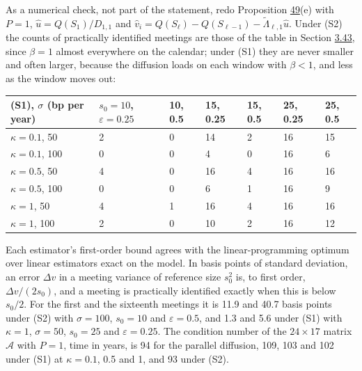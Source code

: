 \documentclass[11pt]{article}
\begin{document}
As a numerical check, not part of the statement, redo Proposition \hyperref[res:Proposition-49]{49}(e) with \(P=1\), \(\hat u=Q(S_1)/D_{1,1}\) and \(\hat v_i=Q(S_\ell)-Q(S_{\ell-1})-\tilde\Lambda_{\ell,1}\hat u\). Under (S2) the counts of practically identified meetings are those of the table in Section \hyperref[sec:3.43]{3.43}, since \(\beta=1\) almost everywhere on the calendar; under (S1) they are never smaller and often larger, because the diffusion loads on each window with \(\beta<1\), and less as the window moves out:

{\scriptsize\setlength{\tabcolsep}{4pt}
\begin{longtable}{lllllll}
\toprule
\textbf{(S1), \(\sigma\) (bp per year)} & \textbf{\(s_0=10\), \(\varepsilon=0.25\)} & \textbf{10, 0.5} & \textbf{15, 0.25} & \textbf{15, 0.5} & \textbf{25, 0.25} & \textbf{25, 0.5} \\
\midrule
\endhead
\bottomrule
\endlastfoot
\(\kappa=0.1\), 50 & 2 & 0 & 14 & 2 & 16 & 15 \\
\(\kappa=0.1\), 100 & 0 & 0 & 4 & 0 & 16 & 6 \\
\(\kappa=0.5\), 50 & 4 & 0 & 16 & 4 & 16 & 16 \\
\(\kappa=0.5\), 100 & 0 & 0 & 6 & 1 & 16 & 9 \\
\(\kappa=1\), 50 & 4 & 1 & 16 & 4 & 16 & 16 \\
\(\kappa=1\), 100 & 2 & 0 & 10 & 2 & 16 & 12 \\
\end{longtable}}

Each estimator's first-order bound agrees with the linear-programming optimum over linear estimators exact on the model. In basis points of standard deviation, an error \(\Delta v\) in a meeting variance of reference size \(s_0^2\) is, to first order, \(\Delta v/(2s_0)\), and a meeting is practically identified exactly when this is below \(s_0/2\). For the first and the sixteenth meetings it is 11.9 and 40.7 basis points under (S2) with \(\sigma=100\), \(s_0=10\) and \(\varepsilon=0.5\), and 1.3 and 5.6 under (S1) with \(\kappa=1\), \(\sigma=50\), \(s_0=25\) and \(\varepsilon=0.25\). The condition number of the \(24\times17\) matrix \(\mathcal A\) with \(P=1\), time in years, is 94 for the parallel diffusion, 109, 103 and 102 under (S1) at \(\kappa=0.1\), 0.5 and 1, and 93 under (S2).
\end{document}
